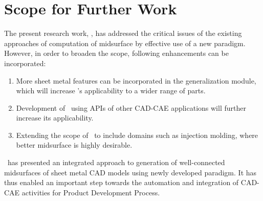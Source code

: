 
\section{Scope for Further Work}

The present research work, \mysystemname, has addressed the critical issues of the existing approaches of computation of midsurface by effective use of a new paradigm. However, in order to broaden the scope, following enhancements can be incorporated:

\begin{enumerate}
\item More sheet metal features can be incorporated in the generalization module, which will increase \mysystemname's applicability to a wider range of parts.
\item Development of \mysystemname~using APIs of other CAD-CAE applications will further increase its applicability.
\item Extending the scope of \mysystemname~to include domains such as injection molding, where better midsurface is highly desirable.
\end{enumerate}


\mysystemname~has presented an integrated approach to generation of well-connected midsurfaces of sheet metal CAD models using newly developed paradigm. It has thus enabled an important step towards the automation and integration of CAD-CAE activities for Product Development Process.
